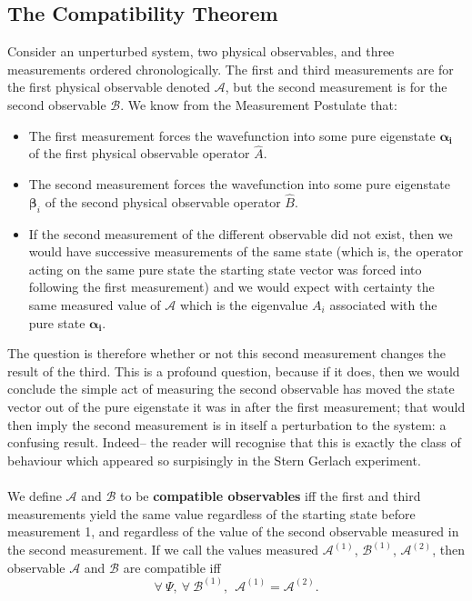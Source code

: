\subsection{The Compatibility Theorem}
Consider an unperturbed system, two physical observables, and three measurements ordered chronologically. The first and third measurements are for the first physical observable denoted $\mathcal{A}$, but the second measurement is for the second observable $\mathcal{B}$. We know from the Measurement Postulate that:
\begin{itemize}
    \item The first measurement forces the wavefunction into some pure eigenstate $\bm{\alpha_{i}}$ of the first physical observable operator $\hat{A}$.
    \item The second measurement forces the wavefunction into some pure eigenstate $\bm{\beta}_{i}$ of the second physical observable operator $\hat{B}$.
    \item If the second measurement of the different observable did not exist, then we would have successive measurements of the same state (which is, the operator acting on the same pure state the starting state vector was forced into following the first measurement) and we would expect with certainty the same measured value of $\mathcal{A}$ which is the eigenvalue $A_{i}$ associated with the pure state $\bm{\alpha_{i}}$.
\end{itemize}
The question is therefore whether or not this second measurement changes the result of the third. This is a profound question, because if it does, then we would conclude the simple act of measuring the second observable has moved the state vector out of the pure eigenstate it was in after the first measurement; that would then imply the second measurement is in itself a perturbation to the system: a confusing result. Indeed-- the reader will recognise that this is exactly the class of behaviour which appeared so surpisingly in the Stern Gerlach experiment.
\\\\ 
We define $\mathcal{A}$ and $\mathcal{B}$ to be \textbf{compatible observables} iff the first and third measurements yield the same value regardless of the starting state before measurement 1, and regardless of the value of the second observable measured in the second measurement. If we call the values measured $\mathcal{A}^{(1)}$, $\mathcal{B}^{(1)}$, $\mathcal{A}^{(2)}$, then observable $\mathcal{A}$ and $\mathcal{B}$ are compatible iff 
$$
\forall\:\Psi,\:\forall\:\mathcal{B}^{(1)},\:\:\mathcal{A}^{(1)}=\mathcal{A}^{(2)}.
$$
